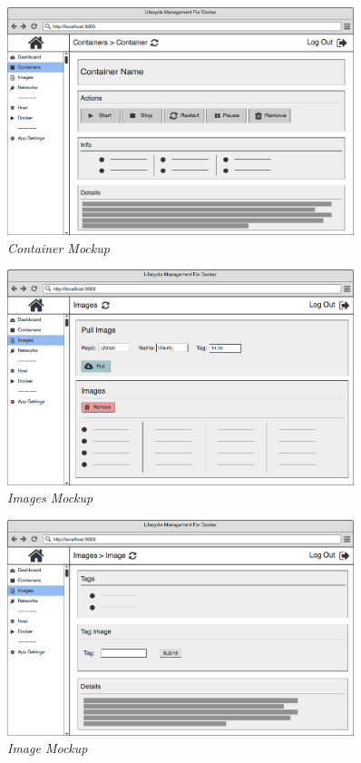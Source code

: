 \begin{figure}[!ht]
\centering
\includegraphics*[width=0.9\textwidth]{wireframes/container}
\caption{\em Container Mockup}
\end{figure}

\begin{figure}[!ht]
\centering
\includegraphics*[width=0.9\textwidth]{wireframes/images}
\caption{\em Images Mockup}
\end{figure}

\begin{figure}[!ht]
\centering
\includegraphics*[width=0.9\textwidth]{wireframes/image}
\caption{\em Image Mockup}
\end{figure}


